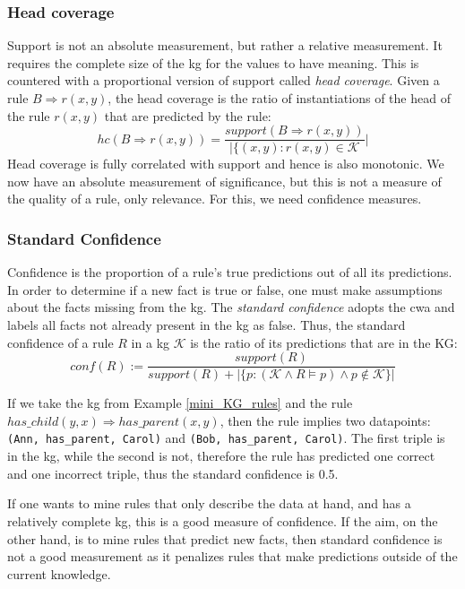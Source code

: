 \subsubsection{Head coverage}
Support is not an absolute measurement, but rather a relative measurement. It requires the complete size of the \gls{kg} for the values to have meaning. This is countered with a proportional version of support called \emph{head coverage}. Given a rule $B \Rightarrow r(x,y)$, the head coverage is the ratio of instantiations of the head of the rule $r(x, y)$ that are predicted by the rule:
\[hc(B \Rightarrow r(x,y)) = \frac{support(B \Rightarrow r(x,y))}{|\{(x, y) : r(x, y) \in \mathcal{K}}|\]
Head coverage is fully correlated with support and hence is also monotonic. We now have an absolute measurement of significance, but this is not a measure of the quality of a rule, only relevance. For this, we need confidence measures.


\subsubsection{Standard Confidence} Confidence is the proportion of a rule's true predictions out of all its predictions. In order to determine if a new fact is true or false, one must make assumptions about the facts missing from the \gls{kg}. The \textit{standard confidence} adopts the \gls{cwa} and labels all facts not already present in the \gls{kg} as false. Thus, the standard confidence of a rule $R$ in a \gls{kg} $\mathcal{K}$ is the ratio of its predictions that are in the KG:
\[conf(R) := \frac{support(R)}{support(R) + | \{p : (\mathcal{K} \wedge R \models p)\wedge p \not\in \mathcal{K} \}|}\]

If we take the \gls{kg} from Example \ref{mini_KG_rules} and the rule $has\_child(y, x) \Rightarrow has\_parent(x, y)$, then the rule implies two datapoints: \texttt{(Ann, has\_parent, Carol)} and \texttt{(Bob, has\_parent, Carol)}. The first triple is in the \gls{kg}, while the second is not, therefore the rule has predicted one correct and one incorrect triple, thus the standard confidence is 0.5.


If one wants to mine rules that only describe the data at hand, and has a relatively complete \gls{kg}, this is a good measure of confidence. If the aim, on the other hand, is to mine rules that predict new facts, then standard confidence is not a good measurement as it penalizes rules that make predictions outside of the current knowledge.


